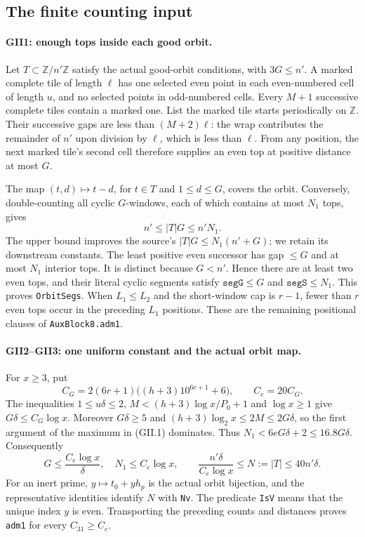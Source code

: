 \documentclass[11pt,a4paper]{article}
\numberwithin{equation}{section}
\theoremstyle{remark}\newtheorem{remark}[theorem]{Remark}
\begin{document}
\subsection{The finite counting input}

\paragraph{GII1: enough tops inside each good orbit.}
Let $T\subset\mathbb Z/n'\mathbb Z$ satisfy the actual good-orbit
conditions, with $3G\le n'$. A marked complete tile of length $\ell$
has one selected even point in each even-numbered cell of length $u$,
and no selected points in odd-numbered cells. Every $M+1$ successive
complete tiles contain a marked one. List the marked tile starts
periodically on $\mathbb Z$. Their successive gaps are less than
$(M+2)\ell$: the wrap contributes the remainder of $n'$ upon division
by $\ell$, which is less than $\ell$. From any position, the next
marked tile's second cell therefore supplies an even top at positive
distance at most $G$.

The map $(t,d)\mapsto t-d$, for $t\in T$ and $1\le d\le G$,
covers the orbit. Conversely, double-counting all cyclic $G$-windows,
each of which contains at most $N_1$ tops, gives
\[
 n'\le |T|G\le n'N_1.\tag{GII.2}
\]
The upper bound improves the source's $|T|G\le N_1(n'+G)$; we retain
its downstream constants. The least positive even successor has gap
$\le G$ and at most $N_1$ interior tops. It is distinct because $G<n'$.
Hence there are at least two even tops, and their literal cyclic
segments satisfy $\texttt{segG}\le G$ and $\texttt{segS}\le N_1$.
This proves \texttt{OrbitSegs}. When $L_1\le L_2$ and the short-window
cap is $r-1$, fewer than $r$ even tops occur in the preceding $L_1$
positions. These are the remaining positional clauses of
\texttt{AuxBlock8.adm1}.

\paragraph{GII2--GII3: one uniform constant and the actual orbit map.}
For $x\ge3$, put
\[
 C_G=2(6r+1)\bigl((h+3)10^{6r+1}+6\bigr),\qquad C_e=20C_G.
\]
The inequalities $1\le u\delta\le2$, $M< (h+3)\log x/P_0+1$ and
$\log x\ge1$ give $G\delta\le C_G\log x$. Moreover $G\delta\ge5$ and
$(h+3)\log_2x\le2M\le2G\delta$, so the first argument of the maximum
in (GII.1) dominates. Thus $N_1<6eG\delta+2\le16.8G\delta$. Consequently
\[
 G\le\frac{C_e\log x}{\delta},\quad N_1\le C_e\log x,\qquad
 \frac{n'\delta}{C_e\log x}\le N:=|T|\le40n'\delta.
 \tag{GII.3}
\]
For an inert prime, $y\mapsto t_0+yh_p$ is the actual orbit bijection,
and the representative identities identify $N$ with \texttt{Nv}.
The predicate \texttt{IsV} means that the unique index $y$ is even.
Transporting the preceding counts and distances proves
\texttt{adm1} for every $C_{31}\ge C_e$.
\end{document}
